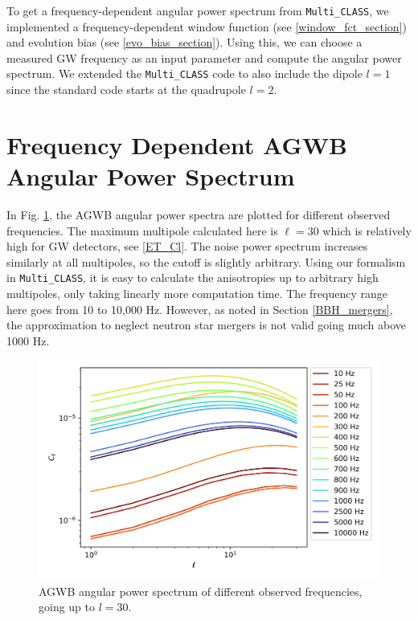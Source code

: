 To get a frequency-dependent angular power spectrum from {\tt Multi\_CLASS}, we implemented a frequency-dependent window function (see \ref{window_fct_section}) and evolution bias (see \ref{evo_bias_section}). Using this, we can choose a measured GW frequency as an input parameter and compute the angular power spectrum. We extended the {\tt Multi\_CLASS} code to also include the dipole $l=1$ since the standard code starts at the quadrupole $l=2$. 

\section{Frequency Dependent AGWB Angular Power Spectrum}
\label{results_power_spectra}

In Fig. \ref{AGWB_anisotropies}, the AGWB angular power spectra are plotted for different observed frequencies. The maximum multipole calculated here is $\ell=30$ which is relatively high for GW detectors, see \ref{ET_Cl}. The noise power spectrum increases similarly at all multipoles, so the cutoff is slightly arbitrary. Using our formalism in {\tt Multi\_CLASS}, it is easy to calculate the anisotropies up to arbitrary high multipoles, only taking linearly more computation time. The frequency range here goes from 10 to 10,000 Hz. However, as noted in Section \ref{BBH_mergers}, the approximation to neglect neutron star mergers is not valid going much above 1000 Hz.

\begin{figure}
    \centering
    \includegraphics[width=1\linewidth]{Images/C_l_frequencies.png}
    \caption{AGWB angular power spectrum of different observed frequencies, going up to $l=30$.}
    \label{AGWB_anisotropies}
\end{figure} 

